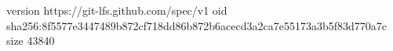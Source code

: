 version https://git-lfs.github.com/spec/v1
oid sha256:8f5577e3447489b872cf718dd86b872b6acecd3a2ca7e55173a3b5f83d770a7c
size 43840
